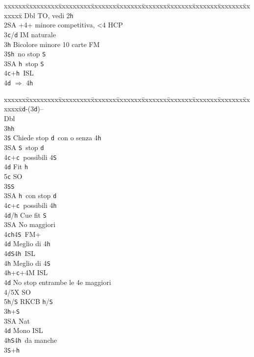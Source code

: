 \documentclass[a4paper,italian]{article}
\newcommand{\BS}{\small{\texttt{S}}}
\newcommand{\BC}{\small{\texttt{c}}}
\newcommand{\BD}{\small{\texttt{d}}}
\newcommand{\BH}{\small{\texttt{h}}}
\newenvironment{bidtable}
{\begin{tabbing}

    xxxxxx\=xxxxxxxxx\=xxxxxxxxx\=xxxxxxx\=xxxxxxx\=xxxxxxx\=xxxxxxx\=xxxxxxx\=xxxxxxx\=xxxxxxx\=\kill}
{\end{tabbing} }%
\begin{document}
\begin{multicols}{2}
\begin{bidtable}
        Dbl \> TO, vedi 2\BH \\
        2\small{SA} +4+ minore competitiva, <4 HCP\\
        3\BC/\BD \> IM naturale\\
        3\BH \> Bicolore minore 10 carte FM\\
        3\BS {}\BH\ no stop \BS \\
        3\small{SA} \BH\ stop \BS \\
        4\BC {}+\BH\ ISL\\
        4\BD \> $\Rightarrow$ 4\BH \-
    \end{bidtable}
    \begin{bidtable}
        2\BD-(3\BD)--\+\\
        Dbl\+\\
        3\BH {}\BH \+\\
        3\BS \> Chiede stop \BD\ con o senza 4\BH\\
        3\small{SA} \BS\ stop \BD\\
        4\BC {}+\BC\ possibili 4\BS\\
        4\BD \> Fit \BH \\
        5\BC \> SO\-\\
        3\BS {}\BS \+\\
        3\small{SA} \BH\ con stop \BD\\
        4\BC {}+\BC\ possibili 4\BH\\
        4\BD/\BH \> Cue fit \BS \-\\
        3\small{SA} \> No maggiori\+\\
        4\BC {}\BH 4\BS\ FM+\+\\
        4\BD \> Meglio di 4\BH \-\\
        4\BD {}\BS 4\BH\ ISL\+\\
        4\BH \> Meglio di 4\BS \-\\
        4\BH {}+\BC +4M ISL\-\\
        4\BD\> No stop entrambe le 4e maggiori\+\\
        4/5X \> SO\\
        5\BH/\BS\> RKCB \BH/\BS\-\\
        3\BH {}+\BS \+\\
        3\small{SA} \> Nat\+\\
        4\BD \> Mono ISL\\
        4\BH {}\BS 4\BH\ da manche\-\-\\
        3\BS {}+\BH \+\\

\end{bidtable}
\end{multicols}
\end{document}
